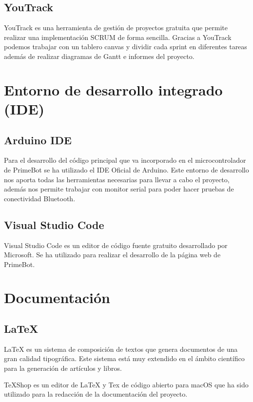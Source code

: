 \subsection{YouTrack}\label{YouTrack}

YouTrack es una herramienta de gestión de proyectos gratuita que permite realizar una implementación SCRUM de forma sencilla.
Gracias a YouTrack podemos trabajar con un tablero canvas y dividir cada sprint en diferentes tareas además de realizar diagramas de Gantt e informes del proyecto.

\section{Entorno de desarrollo integrado
(IDE)}\label{entorno-de-desarrollo-integrado-ide}

\subsection{Arduino IDE}\label{arduino-IDE}

Para el desarrollo del código principal que va incorporado en el microcontrolador de PrimeBot se ha utilizado el IDE Oficial de Arduino.
Este entorno de desarrollo nos aporta todas las herramientas necesarias para llevar a cabo el proyecto, además nos permite trabajar con monitor serial para poder hacer pruebas de conectividad Bluetooth.

\subsection{Visual Studio Code}\label{visual-studio-code}

Visual Studio Code es un editor de código fuente gratuito desarrollado por Microsoft.
Se ha utilizado para realizar el desarrollo de la página web de PrimeBot.

\section{Documentación}\label{documentacion}

\subsection{LaTeX}\label{latex}

LaTeX es un sistema de composición de textos que genera documentos de una gran calidad tipográfica.
Este sistema está muy extendido en el ámbito científico para la generación de artículos y libros. ~\cite{wiki:latex}

TeXShop es un editor de LaTeX y Tex de código abierto para macOS que ha sido utilizado para la redacción de la documentación del proyecto.